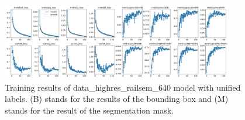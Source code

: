 \documentclass[Master,MDS,english]{BASE/twbook} %
\begin{document}
\begin{figure}[H]
\centering
\includegraphics[width=0.9\textwidth]{images/yolo/highres/results}
\caption{Training results of data\_highres\_railsem\_640 model with unified labels. (B) stands for the results of the bounding box and (M) stands for the result of the segmentation mask.}
\label{fig:training_highres}
\end{figure}
\end{document}
